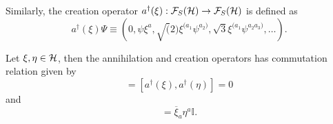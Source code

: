 Similarly, the creation operator \(a^{\dagger}(\xi):{\mathcal{F}}_S({\mathcal{H}})\to{\mathcal{F}}_S({\mathcal{H}})\) is defined as
\begin{equation}
    a^{\dagger}(\xi)\Psi\equiv\left(0,\psi\xi^a,\sqrt(2)\xi^{(a_1}\psi^{a_2)},\sqrt{3}\xi^{(a_1}\psi^{a_2a_3)},\dots\right).
\end{equation}

\begin{proposition}\label{prop:ccr}
    Let \(\xi,\eta\in{\mathcal{H}}\), then the annihilation and creation operators has commutation relation given by
    \begin{equation}
        [a(\overline{\xi}),a(\overline{\eta})]=[a^{\dagger}(\xi),a^{\dagger}(\eta)]=0
    \end{equation}
    and
    \begin{equation}
        [a(\overline{\xi}),a^{\dagger}(\eta)]=\overline{\xi}_a\eta^a\mathbb{I}.
    \end{equation}
\end{proposition}
